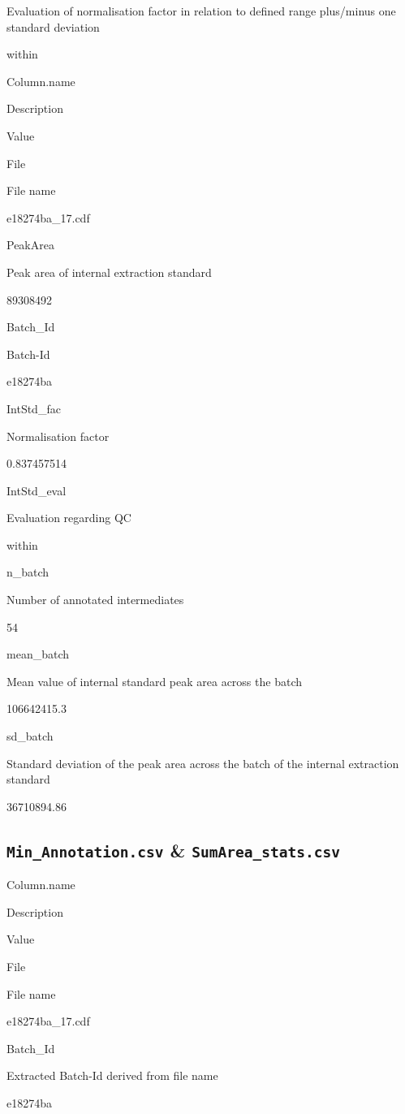 \documentclass[]{book}
\theoremstyle{definition}
\theoremstyle{definition}
\theoremstyle{definition}
\theoremstyle{remark}
\begin{document}
Evaluation of normalisation factor in relation to defined range
plus/minus one standard deviation

within

Column.name

Description

Value

File

File name

e18274ba\_17.cdf

PeakArea

Peak area of internal extraction standard

89308492

Batch\_Id

Batch-Id

e18274ba

IntStd\_fac

Normalisation factor

0.837457514

IntStd\_eval

Evaluation regarding QC

within

n\_batch

Number of annotated intermediates

54

mean\_batch

Mean value of internal standard peak area across the batch

106642415.3

sd\_batch

Standard deviation of the peak area across the batch of the internal
extraction standard

36710894.86

\subsection{\texorpdfstring{\texttt{Min\_Annotation.csv} \&
\texttt{SumArea\_stats.csv}}{Min\_Annotation.csv \& SumArea\_stats.csv}}\label{min_annotation.csv-sumarea_stats.csv}

Column.name

Description

Value

File

File name

e18274ba\_17.cdf

Batch\_Id

Extracted Batch-Id derived from file name

e18274ba
\end{document}
